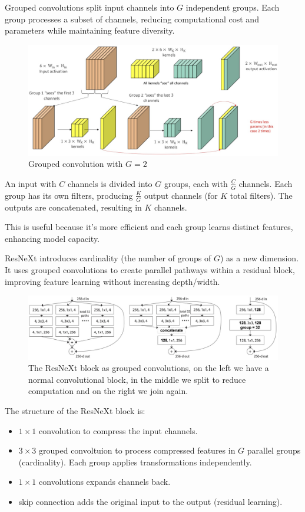\documentclass{article}
\begin{document}
Grouped convolutions split input channels into $G$ independent groups.
Each group processes a subset of channels, reducing computational cost and parameters while maintaining feature diversity.

\begin{figure}[htbp]
  \centering
  \includegraphics[width=0.8\linewidth]{./img/grouped_convolutions.jpg}
  \caption{Grouped convolution with $G=2$}
\end{figure}

An input with $C$ channels is divided into $G$ groups, each with $\frac{C}{G}$ channels.
Each group has its own filters, producing $\frac{K}{G}$ output channels (for $K$ total filters).
The outputs are concatenated, resulting in $K$ channels.

This is useful because it's more efficient and each group learns distinct features, enhancing model capacity.

ResNeXt introduces cardinality (the number of groups of $G$) as a new dimension.
It uses grouped convolutions to create parallel pathways within a residual block, improving feature learning without increasing depth/width.

\begin{figure}[htbp]
  \centering
  \includegraphics[width=0.8\linewidth]{./img/resnext_grouped.jpg}
  \caption{The ResNeXt block as grouped convolutions, on the left we have a normal convolutional block, in the middle we split to reduce computation and on the right we join again.}
\end{figure}

The structure of the ResNeXt block is:
\begin{itemize}
  \item $1\times 1$ convolution to compress the input channels.
  \item $3\times 3$ grouped convoltuion to process compressed features in $G$ parallel groups (cardinality). Each group applies transformations independently.
  \item $1\times 1$ convolutions expands channels back.
  \item skip connection adds the original input to the output (residual learning).
\end{itemize}
\end{document}

